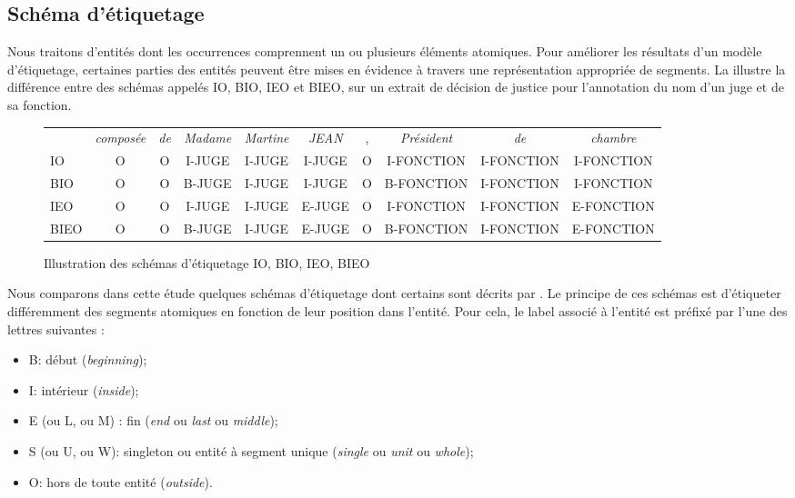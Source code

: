 \subsection{Schéma d'étiquetage}
Nous traitons d'entités dont les occurrences comprennent un ou plusieurs éléments atomiques. Pour améliorer les résultats d'un modèle d'étiquetage, certaines parties des entités peuvent être mises en évidence à travers une représentation appropriée de segments. La  illustre la différence entre des schémas appelés IO, BIO, IEO et BIEO, sur un extrait de décision de justice pour l'annotation du nom d'un juge et de sa fonction.
\begin{figure}[!ht]
	\scriptsize
	\begin{tabular}{l|ccccccccc}
		& \textit{composée} & \textit{de} & \textit{Madame} & \textit{Martine} & \textit{JEAN} & , & \textit{Président} & \textit{de} & \textit{chambre} \\ 
		IO & O & O & I-JUGE & I-JUGE & I-JUGE & O & I-FONCTION & I-FONCTION & I-FONCTION \\
		BIO & O & O & B-JUGE & I-JUGE & I-JUGE & O & B-FONCTION & I-FONCTION & I-FONCTION \\
		IEO & O & O & I-JUGE & I-JUGE & E-JUGE & O & I-FONCTION & I-FONCTION & E-FONCTION\\
		BIEO & O & O & B-JUGE & I-JUGE & E-JUGE & O & B-FONCTION & I-FONCTION & E-FONCTION \\
	\end{tabular}
	\caption{Illustration des schémas d'étiquetage IO, BIO, IEO, BIEO}\label{p4_sample-tagmod}
\end{figure}

Nous comparons dans cette étude quelques schémas d'étiquetage dont certains sont décrits par \citet{konkol2015tagModel}. Le principe de ces schémas est d'étiqueter différemment des segments atomiques en fonction de leur position dans l'entité. Pour cela, le label associé à l'entité est préfixé par l'une des lettres suivantes :

\begin{itemize}
	\item B:  début (\textit{beginning});
	\item I: intérieur (\textit{inside});
	\item E (ou L, ou M) : fin (\textit{end} ou \textit{last} ou \textit{middle});
	\item S (ou U, ou W): singleton ou entité à segment unique (\textit{single} ou \textit{unit} ou \textit{whole});
	\item O: hors de toute entité (\textit{outside}).
\end{itemize}

